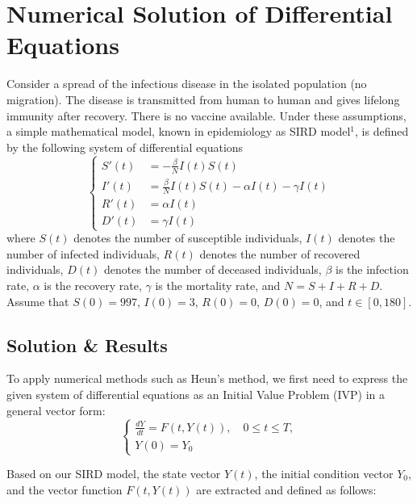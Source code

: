 \documentclass{article}
\begin{document}
\newpage


\section{Numerical Solution of Differential Equations}

Consider a spread of the infectious disease in the isolated population (no migration). The disease is transmitted from human to human and gives lifelong immunity after recovery. There is no vaccine available. Under these assumptions, a simple mathematical model, known in epidemiology as SIRD model$^{1}$, is defined by the following system of differential equations
\begin{equation}
\left\{
\begin{aligned}
S'(t) &= -\frac{\beta}{N}I(t)S(t) \\
I'(t) &= \frac{\beta}{N}I(t)S(t) - \alpha I(t) - \gamma I(t) \\
R'(t) &= \alpha I(t) \\
D'(t) &= \gamma I(t)
\end{aligned}
\right.
\end{equation}
where $S(t)$ denotes the number of susceptible individuals, $I(t)$ denotes the number of infected individuals, $R(t)$ denotes the number of recovered individuals, $D(t)$ denotes the number of deceased individuals, $\beta$ is the infection rate, $\alpha$ is the recovery rate, $\gamma$ is the mortality rate, and $N = S + I + R + D$. Assume that $S(0) = 997$, $I(0) = 3$, $R(0) = 0$, $D(0) = 0$, and $t \in [0, 180]$.

\subsection{Solution \& Results}

To apply numerical methods such as Heun's method, we first need to express the given system of differential equations as an Initial Value Problem (IVP) in a general vector form:
\begin{equation}
\begin{cases}
    \frac{dY}{dt} = F(t, Y(t)), \quad 0 \le t \le T, \\
    Y(0) = Y_0
\end{cases}
\end{equation}

Based on our SIRD model, the state vector $Y(t)$, the initial condition vector $Y_0$, and the vector function $F(t, Y(t))$ are extracted and defined as follows:
\end{document}
